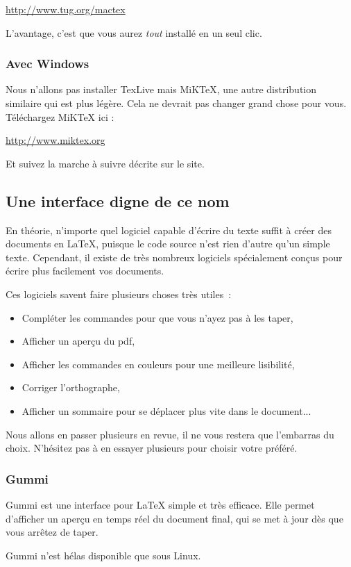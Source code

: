 \documentclass[10pt]{article}
\begin{document}
\url{http://www.tug.org/mactex}

L'avantage, c'est que vous aurez \emph{tout} installé en un seul clic.

\subsubsection{Avec Windows}
Nous n'allons pas installer TexLive mais MiKTeX, une autre distribution similaire qui est plus légère. Cela ne devrait pas changer grand chose pour vous. Téléchargez MiKTeX ici :

\url{http://www.miktex.org}

Et suivez la marche à suivre décrite sur le site.

\subsection{Une interface digne de ce nom}
En théorie, n'importe quel logiciel capable d'écrire du texte suffit à créer des documents en LaTeX, puisque le code source n'est rien d'autre qu'un simple texte.
Cependant, il existe de très nombreux logiciels spécialement conçus pour écrire plus facilement vos documents.

Ces logiciels savent faire plusieurs choses très utiles~:
\begin{itemize}
	\item Compléter les commandes pour que vous n'ayez pas à les taper,
	\item Afficher un aperçu du pdf,
	\item Afficher les commandes en couleurs pour une meilleure lisibilité,
	\item Corriger l'orthographe,
	\item Afficher un sommaire pour se déplacer plus vite dans le document...
\end{itemize}

Nous allons en passer plusieurs en revue, il ne vous restera que l'embarras du choix. N'hésitez pas à en essayer plusieurs pour choisir votre préféré.

\subsubsection{Gummi}
Gummi est une interface pour LaTeX simple et très efficace. Elle permet d'afficher un aperçu en temps réel du document final, qui se met à jour dès que vous arrêtez de taper.

Gummi n'est hélas disponible que sous Linux.
\end{document}
